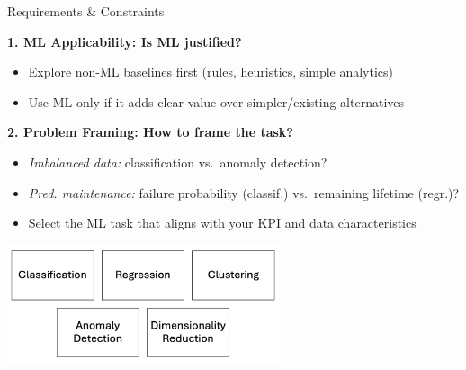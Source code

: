 \documentclass[10pt,compress,t,notes=noshow, xcolor=table]{beamer}
\begin{document}
\begin{frame}{Requirements \& Constraints}
\label{requirements-ml-framing}

\textbf{1. ML Applicability: Is ML justified?}
\begin{itemize}
  \item Explore non-ML baselines first (rules, heuristics, simple analytics)
  \item Use ML only if it adds clear value over simpler/existing alternatives
\end{itemize}
\pause
\textbf{2. Problem Framing: How to frame the task?}
\begin{itemize}
  \item \emph{Imbalanced data:} classification vs.\ anomaly detection?
  \item \emph{Pred. maintenance:} failure probability (classif.) vs.\ remaining lifetime (regr.)?
  \item Select the ML task that aligns with your KPI and data characteristics
\end{itemize}

\centering
\includegraphics[width=0.6\textwidth]{figure_man/MLTasks.png}
\end{frame}

\end{document}
